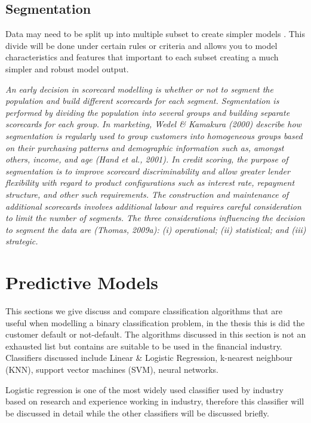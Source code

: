 \subsection{Segmentation}\label{sec:segment}
Data may need to be split up into multiple subset to create simpler models \citep{myatt_making_2007}. This divide will be done under certain rules or criteria and allows you to model characteristics and features that important to each subset creating a much simpler and robust model output.


\textit{An early decision in scorecard modelling is whether or not to segment the population
and build different scorecards for each segment. Segmentation is performed
by dividing the population into several groups and building separate scorecards for
each group. In marketing, Wedel \& Kamakura (2000) describe how segmentation
is regularly used to group customers into homogeneous groups based on their purchasing
patterns and demographic information such as, amongst others, income,
and age (Hand et al., 2001). In credit scoring, the purpose of segmentation is to
improve scorecard discriminability and allow greater lender flexibility with regard
to product configurations such as interest rate, repayment structure, and other such
requirements. The construction and maintenance of additional scorecards involves
additional labour and requires careful consideration to limit the number of segments.
The three considerations influencing the decision to segment the data are (Thomas,
2009a): (i) operational; (ii) statistical; and (iii) strategic.
\citep{kennedy_credit_2013}}

\section{Predictive Models}\label{sec:predictModels}
This sections we give discuss and compare classification algorithms that are useful when modelling a binary classification problem, in the thesis this is did the customer default or not-default. The algorithms discussed in this section is not an exhausted list but contains are suitable to be used in the financial industry. Classifiers discussed include Linear \& Logistic Regression, k-nearest neighbour (KNN), support vector machines (SVM), neural networks. 

Logistic regression is one of the most widely used classifier used by industry based on research and experience working in industry, therefore this classifier will be discussed in detail while the other classifiers will be discussed briefly.

